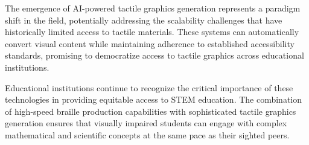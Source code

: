 The emergence of AI-powered tactile graphics generation represents a paradigm shift in the field, potentially addressing the scalability challenges that have historically limited access to tactile materials. These systems can automatically convert visual content while maintaining adherence to established accessibility standards, promising to democratize access to tactile graphics across educational institutions.

Educational institutions continue to recognize the critical importance of these technologies in providing equitable access to STEM education. The combination of high-speed braille production capabilities with sophisticated tactile graphics generation ensures that visually impaired students can engage with complex mathematical and scientific concepts at the same pace as their sighted peers.
